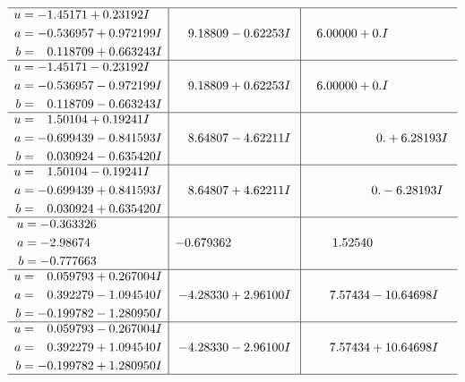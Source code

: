 \documentclass[1p]{elsarticle_modified}
\theoremstyle{definition}
\begin{document}
$$\begin{array}{c|c|c}
 \hline 
\begin{aligned}
u &= -1.45171 + 0.23192 I \\
a &= -0.536957 + 0.972199 I \\
b &= \phantom{-}0.118709 + 0.663243 I\end{aligned}
 & \phantom{-}9.18809 - 0.62253 I & \phantom{-}6.00000 + 0. I\phantom{ +0.000000I} \\ \hline\begin{aligned}
u &= -1.45171 - 0.23192 I \\
a &= -0.536957 - 0.972199 I \\
b &= \phantom{-}0.118709 - 0.663243 I\end{aligned}
 & \phantom{-}9.18809 + 0.62253 I & \phantom{-}6.00000 + 0. I\phantom{ +0.000000I} \\ \hline\begin{aligned}
u &= \phantom{-}1.50104 + 0.19241 I \\
a &= -0.699439 - 0.841593 I \\
b &= \phantom{-}0.030924 - 0.635420 I\end{aligned}
 & \phantom{-}8.64807 - 4.62211 I & \phantom{-0.000000 -}0. + 6.28193 I \\ \hline\begin{aligned}
u &= \phantom{-}1.50104 - 0.19241 I \\
a &= -0.699439 + 0.841593 I \\
b &= \phantom{-}0.030924 + 0.635420 I\end{aligned}
 & \phantom{-}8.64807 + 4.62211 I & \phantom{-0.000000 } 0. - 6.28193 I \\ \hline\begin{aligned}
u &= -0.363326\phantom{ +0.000000I} \\
a &= -2.98674\phantom{ +0.000000I} \\
b &= -0.777663\phantom{ +0.000000I}\end{aligned}
 & -0.679362\phantom{ +0.000000I} & \phantom{-}1.52540\phantom{ +0.000000I} \\ \hline\begin{aligned}
u &= \phantom{-}0.059793 + 0.267004 I \\
a &= \phantom{-}0.392279 - 1.094540 I \\
b &= -0.199782 - 1.280950 I\end{aligned}
 & -4.28330 + 2.96100 I & \phantom{-}7.57434 - 10.64698 I \\ \hline\begin{aligned}
u &= \phantom{-}0.059793 - 0.267004 I \\
a &= \phantom{-}0.392279 + 1.094540 I \\
b &= -0.199782 + 1.280950 I\end{aligned}
 & -4.28330 - 2.96100 I & \phantom{-}7.57434 + 10.64698 I\\
 \hline 
 \end{array}$$\newpage
\end{document}
